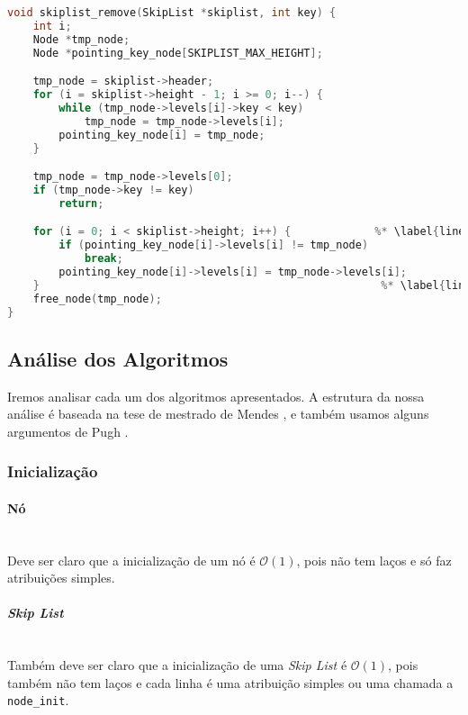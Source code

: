 \documentclass[paper=a4, fontsize=11pt]{scrartcl} %
\numberwithin{equation}{section}
\numberwithin{figure}{section}
\numberwithin{table}{section}
\numberwithin{definition}{section}
\numberwithin{theorem}{section}
\numberwithin{property}{section}
\numberwithin{proposition}{section}
\newcommand{\cO}{\ensuremath{\mathcal{O}}}
\newcommand{\SL}{\textit{Skip List}\xspace}
\begin{document}
\begin{lstlisting}[caption=Remoção., language=C]
void skiplist_remove(SkipList *skiplist, int key) {
    int i;
    Node *tmp_node;
    Node *pointing_key_node[SKIPLIST_MAX_HEIGHT];

    tmp_node = skiplist->header;
    for (i = skiplist->height - 1; i >= 0; i--) {
        while (tmp_node->levels[i]->key < key)
            tmp_node = tmp_node->levels[i];
        pointing_key_node[i] = tmp_node;
    }

    tmp_node = tmp_node->levels[0];
    if (tmp_node->key != key) 
        return;

    for (i = 0; i < skiplist->height; i++) {             %* \label{line:rem_p1} *)
        if (pointing_key_node[i]->levels[i] != tmp_node)
            break;
        pointing_key_node[i]->levels[i] = tmp_node->levels[i];
    }                                                     %* \label{line:rem_p2} *)
    free_node(tmp_node);
}

\end{lstlisting}


\subsection{Análise dos Algoritmos}

Iremos analisar cada um dos algoritmos apresentados. A estrutura da nossa análise é baseada na tese de 
mestrado de Mendes
\cite{mendes2008estruturas}, e também usamos alguns argumentos de Pugh \cite{pugh1990skip}.

\subsubsection{Inicialização}

\paragraph{Nó}
\ \\ 
Deve ser claro que a inicialização de um nó é $\cO(1)$, pois não tem laços e só faz atribuições simples.

\paragraph{\SL}
\ \\
Também deve ser claro que a inicialização de uma \SL é $\cO(1)$, pois também não tem laços e cada linha é
uma atribuição simples ou uma chamada a \verb|node_init|.
\end{document}
